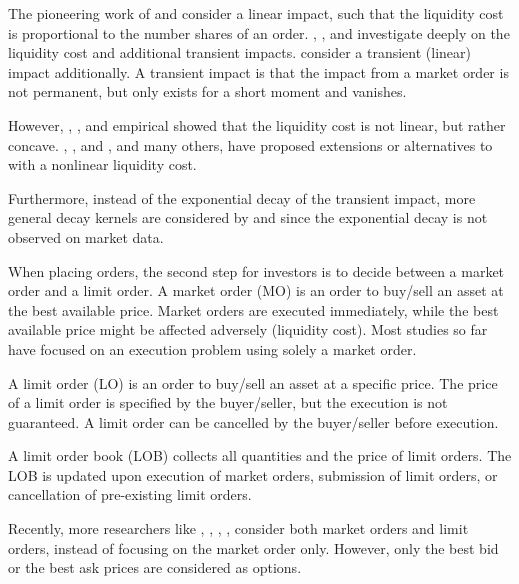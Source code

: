 \documentclass[11pt]{article}
\theoremstyle{plain}
\numberwithin{equation}{section}
\begin{document}
  \par The pioneering work of \citet{bertsimas1998optimal}  
and  \citet{almgren2001optimal} consider a linear impact, such that the liquidity cost is proportional to the number shares of an order. \citet{bank2004hedging}, \citet{CJP:2003} , and \citet{frey2002risk} investigate deeply on the liquidity cost and additional transient impacts. 
 \citet{obizhaeva2013optimal} consider  a transient (linear) impact additionally. A transient impact is that the impact from a market order is not permanent, but only exists for a short moment and vanishes.
 
\par However, \citet{potters2003more},  \citet{eisler2012price}, and  \citet{donier2012market} empirical showed that the liquidity cost is not linear, but rather concave. \citet{alfonsi2010} ,    \citet{predoiu2011optimal},   \citet{gatheral2010no} and   \citet{gueant2015optimal}, and many others, have proposed extensions or alternatives to \citet{obizhaeva2013optimal} with a nonlinear liquidity cost.  

\par Furthermore, instead of the exponential decay of the transient impact, more general decay kernels are considered by  \citet{alfonsi2012order}  and \citet{gatheral2012transient} since the exponential decay is not observed on market data. 

\medskip

 \par When placing orders, the second step for investors is to decide between a market order and a limit order. A market order (MO) is an order to buy/sell an asset at the best available price. Market orders are executed immediately, while the best available price might be affected adversely (liquidity cost). Most studies so far have focused on an execution problem using solely a market order. 
 \par A limit order (LO) is an order to buy/sell an asset at a specific price. The price of a limit order is specified by the buyer/seller, but the execution is not guaranteed. A limit order can be cancelled by the buyer/seller before execution.

\par A limit order book (LOB) collects all quantities and the price of limit orders. The LOB is updated upon execution of market orders, submission of limit orders, or cancellation of pre-existing limit orders. 
\par Recently, more researchers like \citet{jacquierLiu2017}, \citet{alfonsi2010}, \citet{GuilbaudPham2013}, \citet{Manglaras2015}, \citet{ContKukanov2013} consider both market orders and limit orders, instead of focusing on the market order only. However, only the best bid or the best ask prices are considered as options.
\end{document}
